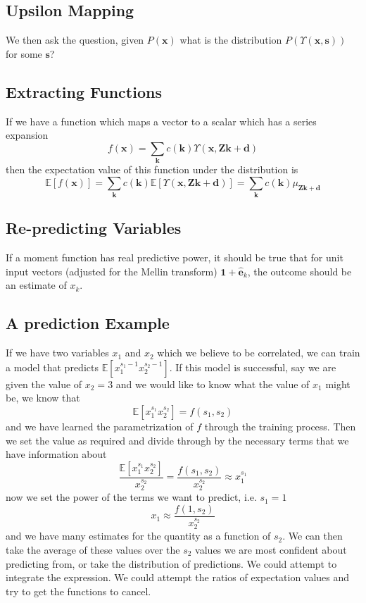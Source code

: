\documentclass[journal=jcisd8,manuscript=article,layout=onecolumn,pdftex,floatfix,amsmath,amssymb,10pt]{achemso}
\begin{document}
\subsection{Upsilon Mapping}
We then ask the question, given $P(\mathbf{x})$ what is the distribution $P(\Upsilon(\mathbf{x},\mathbf{s}))$ for some $\mathbf{s}$?


\subsection{Extracting Functions}
If we have a function which maps a vector to a scalar which has a series expansion \begin{equation}
f(\mathbf{x}) = \sum_{\mathbf{k}} c(\mathbf{k}) \Upsilon(\mathbf{x},\mathbf{Zk+d})
\end{equation}
then the expectation value of this function under the distribution is
\begin{equation}
\mathbb{E}[f(\mathbf{x})] = \sum_{\mathbf{k}} c(\mathbf{k})\mathbb{E}[\Upsilon(\mathbf{x},\mathbf{Zk+d})] = \sum_{\mathbf{k}} c(\mathbf{k})\mu_{\mathbf{Zk+d}}
\end{equation}

\subsection{Re-predicting Variables}
If a moment function has real predictive power, it should be true that for unit input vectors (adjusted for the Mellin transform) $\mathbf{1}+\mathbf{\hat{e}}_k$, the outcome should be an estimate of $x_k$.

\subsection{A prediction Example}
If we have two variables $x_1$ and $x_2$ which we believe to be correlated, we can train a model that predicts $\mathbb{E}[x_1^{s_1-1}x_2^{s_2-1}]$. If this model is successful, say we are given the value of $x_2=3$ and we would like to know what the value of $x_1$ might be, we know that 
\begin{equation}
\mathbb{E}[x_1^{s_1} x_2^{s_2}] = f(s_1,s_2)
\end{equation}
and we have learned the parametrization of $f$ through the training process. Then we set the value as required and divide through by the necessary terms that we have information about
\begin{equation}
\frac{\mathbb{E}[x_1^{s_1} x_2^{s_2}]}{x_2^{s_2}} = \frac{f(s_1,s_2)}{x_2^{s_2}} \approx x_1^{s_1}
\end{equation}
now we set the power of the terms we want to predict, i.e. $s_1=1$
\begin{equation}
x_1 \approx \frac{f(1,s_2)}{x_2^{s_2}}
\end{equation}
and we have many estimates for the quantity as a function of $s_2$. We can then take the average of these values over the $s_2$ values we are most confident about predicting from, or take the distribution of predictions. We could attempt to integrate the expression. We could attempt the ratios of expectation values and try to get the functions to cancel.
\end{document}
